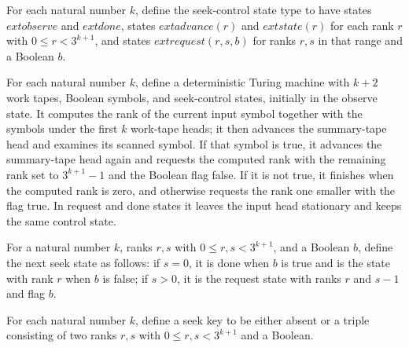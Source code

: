 \begin{definition}
\label{Turing.StepBlock.SeekCtrl}
\leanok
For each natural number $k$, define the seek-control state type to have states
$	ext{observe}$ and $	ext{done}$, states $	ext{advance}(r)$ and $	ext{state}(r)$ for
each rank $r$ with $0 \le r < 3^{k+1}$, and states $	ext{request}(r,s,b)$ for ranks
$r,s$ in that range and a Boolean $b$.
\end{definition}

\begin{definition}
\label{Turing.StepBlock.seekRouterTM}
\leanok
{}
For each natural number $k$, define a deterministic Turing machine with $k+2$ work
tapes, Boolean symbols, and seek-control states, initially in the observe state. It
computes the rank of the current input symbol together with the symbols under the first
$k$ work-tape heads; it then advances the summary-tape head and examines its scanned
symbol. If that symbol is true, it advances the summary-tape head again and requests the
computed rank with the remaining rank set to $3^{k+1}-1$ and the Boolean flag false. If
it is not true, it finishes when the computed rank is zero, and otherwise requests the
rank one smaller with the flag true. In request and done states it leaves the input head
stationary and keeps the same control state.
\end{definition}

\begin{definition}
\label{Turing.StepBlock.seekNext}
\leanok
{}
For a natural number $k$, ranks $r,s$ with $0 \le r,s < 3^{k+1}$, and a Boolean $b$,
define the next seek state as follows: if $s=0$, it is done when $b$ is true and is the
state with rank $r$ when $b$ is false; if $s>0$, it is the request state with ranks $r$
and $s-1$ and flag $b$.
\end{definition}

\begin{definition}
\label{Turing.StepBlock.SeekKey}
\leanok
For each natural number $k$, define a seek key to be either absent or a triple
consisting of two ranks $r,s$ with $0 \le r,s < 3^{k+1}$ and a Boolean.
\end{definition}

